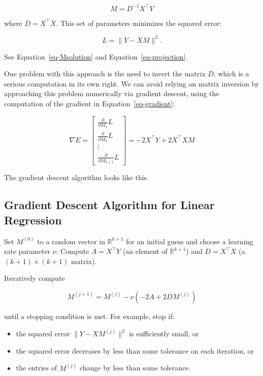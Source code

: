 \documentclass[
  11pt,
  letterpaper,
]{scrbook}
\providecommand{\tightlist}{%
  \setlength{\itemsep}{0pt}\setlength{\parskip}{0pt}}\usepackage{longtable,booktabs,array}
\newcommand{\R}{\mathbb{R}}
\theoremstyle{plain}
\theoremstyle{remark}
\begin{document}
\[
M=D^{-1}X^{\intercal}Y
\]

where \(D=X^{\intercal}X\). This set of parameters minimizes the squared
error:

\[
L = \| Y-XM \|^2.
\]

See Equation~\ref{eq-Msolution} and Equation~\ref{eq-projection}.

One problem with this approach is the need to invert the matrix \(D\),
which is a serious computation in its own right. We can avoid relying on
matrix inversion by approaching this problem numerically via gradient
descent, using the computation of the gradient in
Equation~\ref{eq-gradient}:

\[ 
\nabla E = \left[\begin{matrix} \frac{\partial}{\partial M_1}L \\ \frac{\partial}{\partial M_2}L \\ \vdots \\
\frac{\partial}{\partial M_{k+1}}L\end{matrix}\right] = -2 X^{\intercal}Y + 2
X^{\intercal}XM 
\]

The gradient descent algorithm looks like this.

\hypertarget{alg-graddescentLinearRegression}{}
\hypertarget{gradient-descent-algorithm-for-linear-regression}{%
\subsection{Gradient Descent Algorithm for Linear
Regression}\label{gradient-descent-algorithm-for-linear-regression}}

Set \(M^{(0)}\) to a random vector in \(\R^{k+1}\) for an initial guess
and choose a learning rate parameter \(\nu\). Compute
\(A=X^{\intercal}Y\) (an element of \(\R^{k+1}\)) and
\(D=X^{\intercal}X\) (a \((k+1)\times (k+1)\) matrix).

Iteratively compute

\[
M^{(j+1)}=M^{(j)}-\nu(-2A+2DM^{(j)})
\]

until a stopping condition is met. For example, stop if:

\begin{itemize}
\tightlist
\item
  the squared error \(\|Y-XM^{(j)}\|^2\) is sufficiently small, or
\item
  the squared error decreases by less than some tolerance on each
  iteration, or
\item
  the entries of \(M^{(j)}\) change by less than some tolerance.
\end{itemize}
\end{document}
